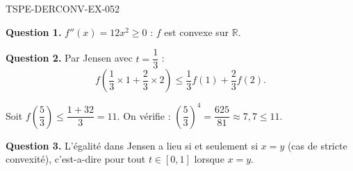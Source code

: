 \begin{corrige}{TSPE-DERCONV-EX-052}

\textbf{Question 1.} $f''(x) = 12x^2 \geq 0$ : $f$ est convexe sur $\mathbb{R}$.


\textbf{Question 2.} Par Jensen avec $t = \dfrac{1}{3}$ :
\[ f\!\left(\frac{1}{3} \times 1 + \frac{2}{3} \times 2\right) \leq \frac{1}{3} f(1) + \frac{2}{3} f(2). \]

Soit $f\!\left(\dfrac{5}{3}\right) \leq \dfrac{1 + 32}{3} = 11$. On vérifie : $\left(\dfrac{5}{3}\right)^4 = \dfrac{625}{81} \approx 7{,}7 \leq 11$. \checkmark

\textbf{Question 3.} L'égalité dans Jensen a lieu si et seulement si $x = y$ (cas de stricte convexité), c'est-a-dire pour tout $t \in [0,1]$ lorsque $x = y$.

\end{corrige}
